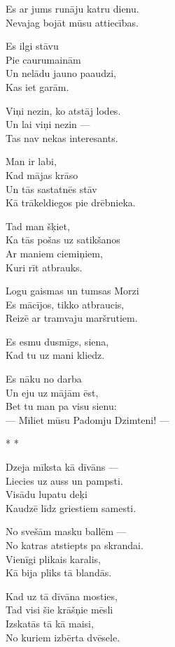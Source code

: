 \documentclass[14pt]{extarticle}
\begin{document}
Es ar jums runāju katru dienu.\\
Nevajag bojāt mūsu attiecības.

Es ilgi stāvu\\
Pie caurumainām\\
Un nelādu jauno paaudzi,\\
Kas iet garām.

Viņi nezin, ko atstāj lodes.\\
Un lai viņi nezin ---\\
Tas nav nekas interesants.

Man ir labi,\\
Kad mājas krāso\\
Un tās sastatnēs stāv\\
Kā trākeldiegos pie drēbnieka.

Tad man šķiet,\\
Ka tās pošas uz satikšanos\\
Ar maniem ciemiņiem,\\
Kuri rīt atbrauks.

Logu gaismas un tumsas Morzi\\
Es mācījos, tikko atbraucis,\\
Reizē ar tramvaju maršrutiem.

Es esmu dusmīgs, siena,\\
Kad tu uz mani kliedz.

Es nāku no darba\\
Un eju uz mājām ēst,\\
Bet tu man pa visu sienu:\\
--- Mīliet mūsu Padomju Dzimteni! ---


\newpage

{\large \sc * * *}

Dzeja mīksta kā dīvāns ---\\
Liecies uz auss un pampsti.\\
Visādu lupatu deķi\\
Kaudzē līdz griestiem samesti.

No svešām masku ballēm ---\\
No katras atstiepts pa skrandai.\\
Vienīgi plikais karalis,\\
Kā bija pliks tā blandās.

Kad uz tā dīvāna mosties,\\
Tad visi šie krāšņie mēsli\\
Izskatās tā kā maisi,\\
No kuriem izbērta dvēsele.
\end{document}
